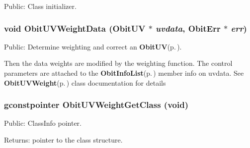 Public: Class initializer. 

\subsubsection{\setlength{\rightskip}{0pt plus 5cm}void Obit\-UVWeight\-Data ({\bf Obit\-UV} $\ast$ {\em uvdata}, {\bf Obit\-Err} $\ast$ {\em err})}\label{ObitUVWeight_8h_a4}


Public: Determine weighting and correct an {\bf Obit\-UV}{\rm (p.\,\pageref{structObitUV})}. 

Then the data weights are modified by the weighting function. The control parameters are attached to the {\bf Obit\-Info\-List}{\rm (p.\,\pageref{structObitInfoList})} member info on uvdata. See {\bf Obit\-UVWeight}{\rm (p.\,\pageref{structObitUVWeight})} class documentation for details 
\subsubsection{\setlength{\rightskip}{0pt plus 5cm}gconstpointer Obit\-UVWeight\-Get\-Class (void)}\label{ObitUVWeight_8h_a3}


Public: Class\-Info pointer. 

\begin{Desc}
\item[Returns:]pointer to the class structure. \end{Desc}
